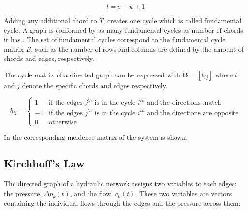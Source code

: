 \begin{equation}
  \label{Numberofchords}
  l = e - n +1
\end{equation}

Adding any additional chord to $T$, creates one cycle which is called fundamental cycle. A graph is conformed by as many fundamental cycles as number of chords it has \cite{GraphModel}.  
The set of fundamental cycles correspond to the fundamental cycle matrix $B$, such as the number of rows and columns are defined by the amount of chords and edges, respectively. 

The cycle matrix of a directed graph can be expressed with $\pmb{B} = [b_{ij}]$ where $i$ and $j$ denote the specific chords and 
edges respectively. 

\begin{equation}
\label{DiGraphCycle}
 b_{ij} =
		\left\{
		\begin{array}{ll}
		
		1 			&      \text{if the edges $j^{th}$ is in the cycle $i^{th}$ and the directions match}	
\\
		-1                       &     \text{if the edges $j^{th}$ is in the cycle $i^{th}$ and the directions are opposite}
\\

                0                       &      \text{otherwise}

		\end{array}
		\right.
\end{equation}	

In  the corresponding incidence matrix of the system is 
shown.

\subsection{Kirchhoff's Law}
\label{KirchhoffSection}

The directed graph of a hydraulic network assigns two variables to each edges: 
the pressure, $\Delta p_k(t)$, and the flow, $q_k(t)$. These two variables are vectors containing the individual flows through the edges and 
the pressure across them:


